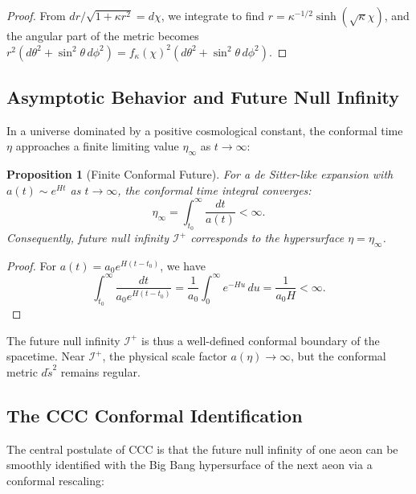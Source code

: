 \documentclass[11pt,a4paper]{article}
\theoremstyle{plain}
\newtheorem{proposition}[theorem]{Proposition}
\theoremstyle{definition}
\theoremstyle{remark}
\newcommand{\scriplus}{\mathcal{I}^+}
\begin{document}
\begin{proof}
From $dr/\sqrt{1 + \kappa r^2} = d\chi$, we integrate to find $r = \kappa^{-1/2} \sinh(\sqrt{\kappa} \chi)$, and the angular part of the metric becomes $r^2(d\theta^2 + \sin^2\theta \, d\phi^2) = f_\kappa(\chi)^2 (d\theta^2 + \sin^2\theta \, d\phi^2)$.
\end{proof}

\subsection{Asymptotic Behavior and Future Null Infinity}

In a universe dominated by a positive cosmological constant, the conformal time $\eta$ approaches a finite limiting value $\eta_\infty$ as $t \to \infty$:

\begin{proposition}[Finite Conformal Future]\label{prop:finite_eta}
For a de Sitter-like expansion with $a(t) \sim e^{Ht}$ as $t \to \infty$, the conformal time integral converges:
\begin{equation}\label{eq:eta_converges}
    \eta_\infty = \int_{t_0}^{\infty} \frac{dt}{a(t)} < \infty.
\end{equation}
Consequently, future null infinity $\scriplus$ corresponds to the hypersurface $\eta = \eta_\infty$.
\end{proposition}

\begin{proof}
For $a(t) = a_0 e^{H(t - t_0)}$, we have
\begin{equation}
    \int_{t_0}^{\infty} \frac{dt}{a_0 e^{H(t - t_0)}} = \frac{1}{a_0} \int_0^\infty e^{-Hu} \, du = \frac{1}{a_0 H} < \infty.
\end{equation}
\end{proof}

The future null infinity $\scriplus$ is thus a well-defined conformal boundary of the spacetime. Near $\scriplus$, the physical scale factor $a(\eta) \to \infty$, but the conformal metric $d\tilde{s}^2$ remains regular.

\subsection{The CCC Conformal Identification}

The central postulate of CCC is that the future null infinity of one aeon can be smoothly identified with the Big Bang hypersurface of the next aeon via a conformal rescaling:
\end{document}
